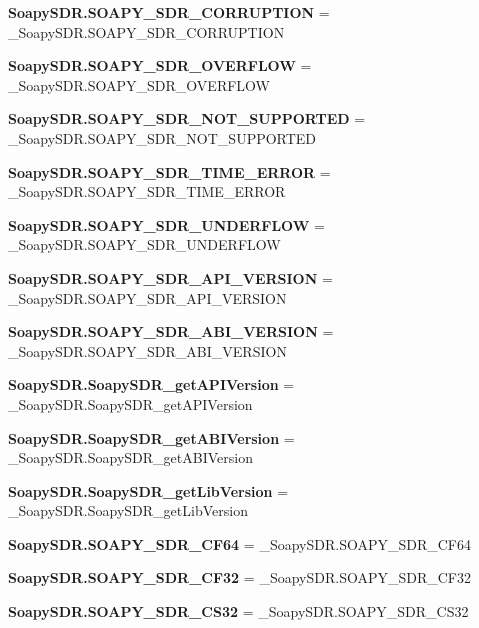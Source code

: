 \begin{DoxyCompactItemize}
\item 
{\bf Soapy\+S\+D\+R.\+S\+O\+A\+P\+Y\+\_\+\+S\+D\+R\+\_\+\+C\+O\+R\+R\+U\+P\+T\+I\+ON} = \+\_\+\+Soapy\+S\+D\+R.\+S\+O\+A\+P\+Y\+\_\+\+S\+D\+R\+\_\+\+C\+O\+R\+R\+U\+P\+T\+I\+ON
\item 
{\bf Soapy\+S\+D\+R.\+S\+O\+A\+P\+Y\+\_\+\+S\+D\+R\+\_\+\+O\+V\+E\+R\+F\+L\+OW} = \+\_\+\+Soapy\+S\+D\+R.\+S\+O\+A\+P\+Y\+\_\+\+S\+D\+R\+\_\+\+O\+V\+E\+R\+F\+L\+OW
\item 
{\bf Soapy\+S\+D\+R.\+S\+O\+A\+P\+Y\+\_\+\+S\+D\+R\+\_\+\+N\+O\+T\+\_\+\+S\+U\+P\+P\+O\+R\+T\+ED} = \+\_\+\+Soapy\+S\+D\+R.\+S\+O\+A\+P\+Y\+\_\+\+S\+D\+R\+\_\+\+N\+O\+T\+\_\+\+S\+U\+P\+P\+O\+R\+T\+ED
\item 
{\bf Soapy\+S\+D\+R.\+S\+O\+A\+P\+Y\+\_\+\+S\+D\+R\+\_\+\+T\+I\+M\+E\+\_\+\+E\+R\+R\+OR} = \+\_\+\+Soapy\+S\+D\+R.\+S\+O\+A\+P\+Y\+\_\+\+S\+D\+R\+\_\+\+T\+I\+M\+E\+\_\+\+E\+R\+R\+OR
\item 
{\bf Soapy\+S\+D\+R.\+S\+O\+A\+P\+Y\+\_\+\+S\+D\+R\+\_\+\+U\+N\+D\+E\+R\+F\+L\+OW} = \+\_\+\+Soapy\+S\+D\+R.\+S\+O\+A\+P\+Y\+\_\+\+S\+D\+R\+\_\+\+U\+N\+D\+E\+R\+F\+L\+OW
\item 
{\bf Soapy\+S\+D\+R.\+S\+O\+A\+P\+Y\+\_\+\+S\+D\+R\+\_\+\+A\+P\+I\+\_\+\+V\+E\+R\+S\+I\+ON} = \+\_\+\+Soapy\+S\+D\+R.\+S\+O\+A\+P\+Y\+\_\+\+S\+D\+R\+\_\+\+A\+P\+I\+\_\+\+V\+E\+R\+S\+I\+ON
\item 
{\bf Soapy\+S\+D\+R.\+S\+O\+A\+P\+Y\+\_\+\+S\+D\+R\+\_\+\+A\+B\+I\+\_\+\+V\+E\+R\+S\+I\+ON} = \+\_\+\+Soapy\+S\+D\+R.\+S\+O\+A\+P\+Y\+\_\+\+S\+D\+R\+\_\+\+A\+B\+I\+\_\+\+V\+E\+R\+S\+I\+ON
\item 
{\bf Soapy\+S\+D\+R.\+Soapy\+S\+D\+R\+\_\+get\+A\+P\+I\+Version} = \+\_\+\+Soapy\+S\+D\+R.\+Soapy\+S\+D\+R\+\_\+get\+A\+P\+I\+Version
\item 
{\bf Soapy\+S\+D\+R.\+Soapy\+S\+D\+R\+\_\+get\+A\+B\+I\+Version} = \+\_\+\+Soapy\+S\+D\+R.\+Soapy\+S\+D\+R\+\_\+get\+A\+B\+I\+Version
\item 
{\bf Soapy\+S\+D\+R.\+Soapy\+S\+D\+R\+\_\+get\+Lib\+Version} = \+\_\+\+Soapy\+S\+D\+R.\+Soapy\+S\+D\+R\+\_\+get\+Lib\+Version
\item 
{\bf Soapy\+S\+D\+R.\+S\+O\+A\+P\+Y\+\_\+\+S\+D\+R\+\_\+\+C\+F64} = \+\_\+\+Soapy\+S\+D\+R.\+S\+O\+A\+P\+Y\+\_\+\+S\+D\+R\+\_\+\+C\+F64
\item 
{\bf Soapy\+S\+D\+R.\+S\+O\+A\+P\+Y\+\_\+\+S\+D\+R\+\_\+\+C\+F32} = \+\_\+\+Soapy\+S\+D\+R.\+S\+O\+A\+P\+Y\+\_\+\+S\+D\+R\+\_\+\+C\+F32
\item 
{\bf Soapy\+S\+D\+R.\+S\+O\+A\+P\+Y\+\_\+\+S\+D\+R\+\_\+\+C\+S32} = \+\_\+\+Soapy\+S\+D\+R.\+S\+O\+A\+P\+Y\+\_\+\+S\+D\+R\+\_\+\+C\+S32

\end{DoxyCompactItemize}
